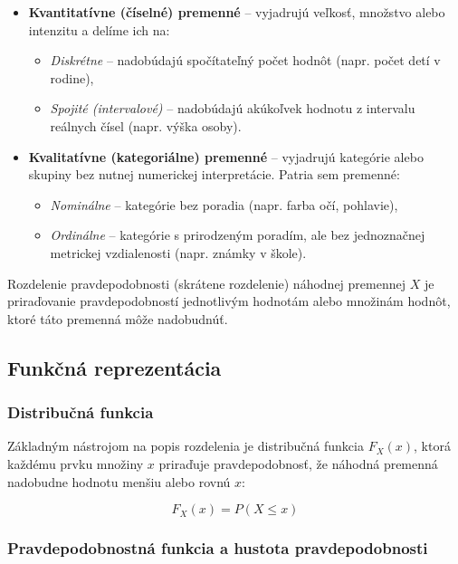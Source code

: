 \begin{itemize}
  \item \textbf{Kvantitatívne (číselné) premenné} – vyjadrujú veľkosť, množstvo alebo intenzitu a delíme ich na:
  \begin{itemize}
    \item \textit{Diskrétne} – nadobúdajú spočítateľný počet hodnôt (napr. počet detí v rodine),
    \item \textit{Spojité (intervalové)} – nadobúdajú akúkoľvek hodnotu z intervalu reálnych čísel (napr. výška osoby).
  \end{itemize}

  \item \textbf{Kvalitatívne (kategoriálne) premenné} – vyjadrujú kategórie alebo skupiny bez nutnej numerickej interpretácie. Patria sem premenné:
  \begin{itemize}
    \item \textit{Nominálne} – kategórie bez poradia (napr. farba očí, pohlavie),
    \item \textit{Ordinálne} – kategórie s prirodzeným poradím, ale bez jednoznačnej metrickej vzdialenosti (napr. známky v škole).
  \end{itemize}
\end{itemize}

Rozdelenie pravdepodobnosti (skrátene rozdelenie) náhodnej premennej $X$ je priraďovanie pravdepodobností jednotlivým hodnotám alebo množinám hodnôt, ktoré táto premenná môže nadobudnúť.

\subsection{Funkčná reprezentácia}

\subsubsection{Distribučná funkcia}

Základným nástrojom na popis rozdelenia je distribučná funkcia $F_X(x)$, ktorá každému prvku množiny $x$ priraďuje pravdepodobnosť, že náhodná premenná nadobudne hodnotu menšiu alebo rovnú $x$: 

\begin{equation} 
F_X(x) = P(X \leq x) 
\end{equation} 

\subsubsection{Pravdepodobnostná funkcia a hustota pravdepodobnosti}

